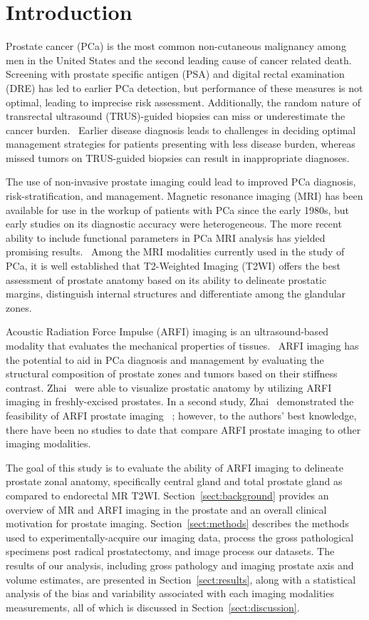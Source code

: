 \section{Introduction}\label{sect:intro}
Prostate cancer (PCa) is the most common non-cutaneous malignancy among men in
the United States and the second leading cause of cancer related
death.~\cite{Howlader2011} Screening with prostate specific antigen (PSA) and
digital rectal examination (DRE) has led to earlier PCa detection, but
performance of these measures is not optimal, leading to imprecise risk
assessment.  Additionally, the random nature of transrectal ultrasound
(TRUS)-guided biopsies can miss or underestimate the cancer
burden.~\cite{Gupta2013} Earlier disease diagnosis leads to challenges in
deciding optimal management strategies for patients presenting with less
disease burden, whereas missed tumors on TRUS-guided biopsies can result in
inappropriate diagnoses. 

The use of non-invasive prostate imaging could lead to improved PCa diagnosis,
risk-stratification, and management.  Magnetic resonance imaging (MRI) has been
available for use in the workup of patients with PCa since the early 1980s, but
early studies on its diagnostic accuracy were heterogeneous.  The more
recent ability to include functional parameters in PCa MRI analysis has yielded
promising results.~\cite{Gupta2013,Hricak2007} Among the MRI modalities
currently used in the study of PCa, it is well established that T2-Weighted
Imaging (T2WI) offers the best assessment of prostate anatomy based on its
ability to delineate prostatic margins, distinguish internal structures and
differentiate among the glandular zones. 

Acoustic Radiation Force Impulse (ARFI) imaging is an ultrasound-based modality
that evaluates the mechanical properties of tissues.~\cite{Nightingale2002b}
ARFI imaging has the potential to aid in PCa diagnosis and management by
evaluating the structural composition of prostate zones and tumors based on
their stiffness contrast.  Zhai \etal~were able to visualize prostatic anatomy
by utilizing ARFI imaging in freshly-excised prostates. In a second study, Zhai
\etal~demonstrated the feasibility of ARFI prostate imaging
\invivo~\cite{Zhai2012}; however, to the authors’ best knowledge, there have
been no studies to date that compare \invivo ARFI prostate imaging to other
imaging modalities.~\cite{Zhai2010} 

The goal of this study is to evaluate the ability of ARFI imaging to delineate
prostate zonal anatomy, specifically central gland and total prostate gland
\invivo as compared to endorectal MR T2WI.  Section~\ref{sect:background}
provides an overview of MR and ARFI imaging in the prostate and an overall
clinical motivation for prostate imaging.  Section~\ref{sect:methods} describes
the methods used to experimentally-acquire our imaging data, process the gross
pathological specimens post radical prostatectomy, and image process our
datasets.  The results of our analysis, including gross pathology and imaging
prostate axis and volume estimates, are presented in
Section~\ref{sect:results}, along with a statistical analysis of the bias and
variability associated with each imaging modalities measurements, all of which
is discussed in Section~\ref{sect:discussion}.
